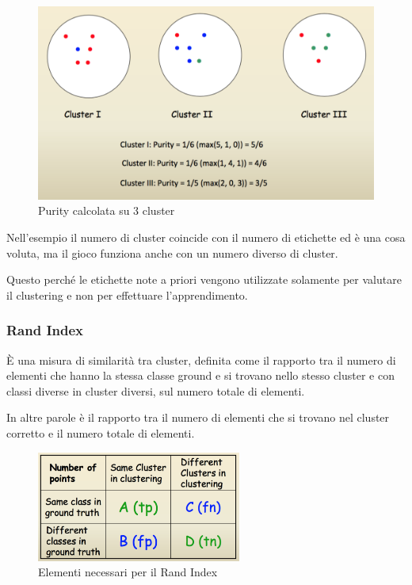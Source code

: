 \begin{figure}[htbp]
\centering
\includegraphics[width=\textwidth]{./notes/immagini/l17-purity.png}
\caption{Purity calcolata su 3 cluster}
\end{figure}

Nell'esempio il numero di cluster coincide con il numero di etichette ed è
una cosa voluta, ma il gioco funziona anche con un numero diverso di
cluster.

Questo perché le etichette note a priori vengono utilizzate solamente per valutare il clustering e non per effettuare l'apprendimento.

\subsubsection{Rand Index}\label{rand-index}

È una misura di similarità tra cluster, definita come il rapporto tra il
numero di elementi che hanno la stessa classe ground e si trovano nello
stesso cluster e con classi diverse in cluster diversi, sul numero
totale di elementi.

In altre parole è il rapporto tra il numero di elementi che si trovano nel cluster corretto e il numero totale di elementi.

\begin{figure}[htbp]
\centering
\includegraphics[width=0.6\textwidth]{./notes/immagini/l17-rand-index.png}
\caption{Elementi necessari per il Rand Index}
\end{figure}

